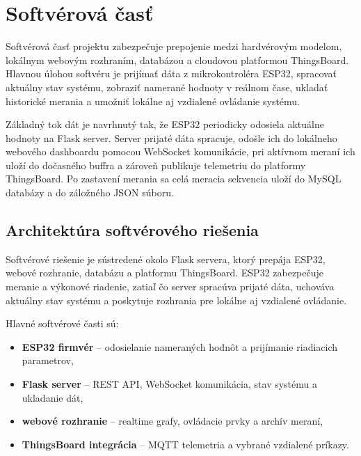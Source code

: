
\section{Softvérová časť}

Softvérová časť projektu zabezpečuje prepojenie medzi hardvérovým modelom, 
lokálnym webovým rozhraním, databázou a cloudovou platformou ThingsBoard. 
Hlavnou úlohou softvéru je prijímať dáta z mikrokontroléra ESP32, 
spracovať aktuálny stav systému, zobraziť namerané hodnoty v reálnom čase, 
ukladať historické merania a umožniť lokálne aj vzdialené ovládanie systému.

Základný tok dát je navrhnutý tak, že ESP32 periodicky odosiela aktuálne hodnoty na 
Flask server. Server prijaté dáta spracuje, odošle ich do lokálneho webového dashboardu 
pomocou WebSocket komunikácie, pri aktívnom meraní ich uloží do dočasného buffra 
a zároveň publikuje telemetriu do platformy ThingsBoard. Po zastavení merania 
sa celá meracia sekvencia uloží do MySQL databázy a do záložného JSON súboru.

\begin{figure}[H]
    \centering
    \label{fig:tok_dat_softver}
\end{figure}

\subsection{Architektúra softvérového riešenia}

Softvérové riešenie je sústredené okolo Flask servera, ktorý prepája ESP32, webové rozhranie, databázu a platformu ThingsBoard. ESP32 zabezpečuje meranie a výkonové riadenie, zatiaľ čo server spracúva prijaté dáta, uchováva aktuálny stav systému a poskytuje rozhrania pre lokálne aj vzdialené ovládanie.

Hlavné softvérové časti sú:

\begin{itemize}
    \item \textbf{ESP32 firmvér} -- odosielanie nameraných hodnôt a prijímanie riadiacich parametrov,
    \item \textbf{Flask server} -- REST API, WebSocket komunikácia, stav systému a ukladanie dát,
    \item \textbf{webové rozhranie} -- realtime grafy, ovládacie prvky a archív meraní,
    \item \textbf{ThingsBoard integrácia} -- MQTT telemetria a vybrané vzdialené príkazy.
\end{itemize}

